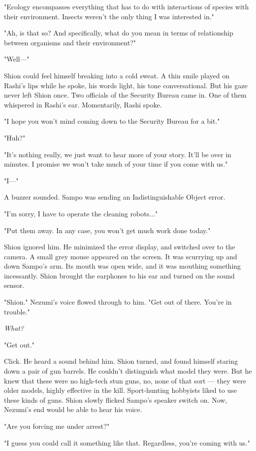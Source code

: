 "Ecology encompasses everything that has to do with interactions of
species with their environment. Insects weren't the only thing I was
interested in."

"Ah, is that so? And specifically, what do you mean in terms of
relationship between organisms and their environment?"

"Well---"

Shion could feel himself breaking into a cold sweat. A thin smile played
on Rashi's lips while he spoke, his words light, his tone
conversational. But his gaze never left Shion once. Two officials of the
Security Bureau came in. One of them whispered in Rashi's ear.
Momentarily, Rashi spoke.

"I hope you won't mind coming down to the Security Bureau for a bit."

"Huh?"

"It's nothing really, we just want to hear more of your story. It'll be
over in minutes. I promise we won't take much of your time if you come
with us."

"I---"

A buzzer sounded. Sampo was sending an Indistinguishable Object error.

"I'm sorry, I have to operate the cleaning robots..."

"Put them away. In any case, you won't get much work done today."

Shion ignored him. He minimized the error display, and switched over to
the camera. A small grey mouse appeared on the screen. It was scurrying
up and down Sampo's arm. Its mouth was open wide, and it was mouthing
something incessantly. Shion brought the earphones to his ear and turned
on the sound sensor.

"Shion." Nezumi's voice flowed through to him. "Get out of there. You're
in trouble."

\emph{What?}

"Get out."

Click. He heard a sound behind him. Shion turned, and found himself
staring down a pair of gun barrels. He couldn't distinguish what model
they were. But he knew that these were no high-tech stun guns, no, none
of that sort --- they were older models, highly effective in the kill.
Sport-hunting hobbyists liked to use these kinds of guns. Shion slowly
flicked Sampo's speaker switch on. Now, Nezumi's end would be able to
hear his voice.

"Are you forcing me under arrest?"

"I guess you could call it something like that. Regardless, you're
coming with us."

